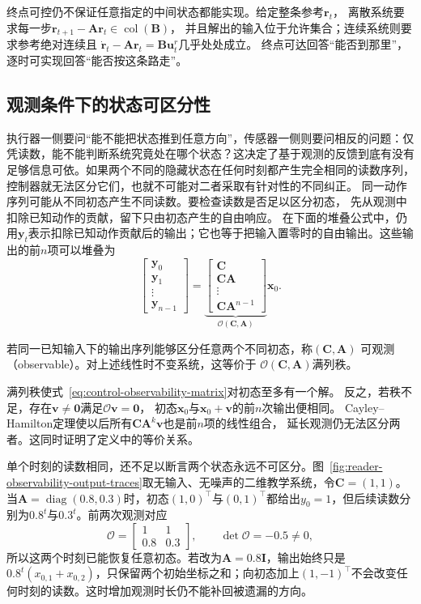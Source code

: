 终点可控仍不保证任意指定的中间状态都能实现。给定整条参考$\bm r_t$，
离散系统要求每一步$\bm r_{t+1}-\bm A\bm r_t\in\operatorname{col}(\bm B)$，
并且解出的输入位于允许集合；连续系统则要求参考绝对连续且
$\dot{\bm r}_t-\bm A\bm r_t=\bm B\bm u_t^r$几乎处处成立。
终点可达回答“能否到那里”，逐时可实现回答“能否按这条路走”。

\subsection{观测条件下的状态可区分性}
执行器一侧要问“能不能把状态推到任意方向”，传感器一侧则要问相反的问题：仅凭读数，能不能判断系统究竟处在哪个状态？这决定了基于观测的反馈到底有没有足够信息可依。如果两个不同的隐藏状态在任何时刻都产生完全相同的读数序列，控制器就无法区分它们，也就不可能对二者采取有针对性的不同纠正。
同一动作序列可能从不同初态产生不同读数。要检查读数是否足以区分初态，
先从观测中扣除已知动作的贡献，留下只由初态产生的自由响应。
在下面的堆叠公式中，仍用$\bm y_t$表示扣除已知动作贡献后的输出；它也等于把输入置零时的自由输出。这些输出的前$n$项可以堆叠为
\begin{equation}
  \begin{bmatrix}\bm y_0\\\bm y_1\\\vdots\\\bm y_{n-1}\end{bmatrix}
  =
  \underbrace{\begin{bmatrix}
    \bm C\\\bm C\bm A\\\vdots\\\bm C\bm A^{n-1}
  \end{bmatrix}}_{\mathcal O(\bm C,\bm A)}\bm x_0.
  \label{eq:control-observability-matrix}
\end{equation}
\begin{definition}[可观测性]
\label{def:control-observability-detectability}
若同一已知输入下的输出序列能够区分任意两个不同初态，称$(\bm C,\bm A)$
可观测（observable）。对上述线性时不变系统，这等价于
$\mathcal O(\bm C,\bm A)$满列秩。
\end{definition}

满列秩使式~\eqref{eq:control-observability-matrix}对初态至多有一个解。
反之，若秩不足，存在$\bm v\neq\bm0$满足$\mathcal O\bm v=\bm0$，
初态$\bm x_0$与$\bm x_0+\bm v$的前$n$次输出便相同。
Cayley--Hamilton定理使以后所有$\bm C\bm A^k\bm v$也是前$n$项的线性组合，
延长观测仍无法区分两者。这同时证明了定义中的等价关系。

单个时刻的读数相同，还不足以断言两个状态永远不可区分。图~\ref{fig:reader-observability-output-traces}取无输入、无噪声的二维教学系统，令$\bm C=(1,1)$。当$\bm A=\operatorname{diag}(0.8,0.3)$时，初态$(1,0)^\top$与$(0,1)^\top$都给出$y_0=1$，但后续读数分别为$0.8^t$与$0.3^t$。前两次观测对应
\[
  \mathcal O=\begin{bmatrix}1&1\\0.8&0.3\end{bmatrix},
  \qquad \det\mathcal O=-0.5\neq0,
\]
所以这两个时刻已能恢复任意初态。若改为$\bm A=0.8\bm I$，输出始终只是$0.8^t(x_{0,1}+x_{0,2})$，只保留两个初始坐标之和；向初态加上$(1,-1)^\top$不会改变任何时刻的读数。这时增加观测时长仍不能补回被遗漏的方向。

